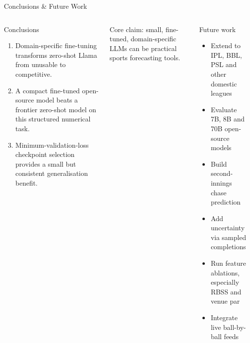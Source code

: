 \documentclass[aspectratio=169,10pt]{beamer}
\begin{document}
\begin{frame}{Conclusions \& Future Work}
\scriptsize
\begin{columns}[T,onlytextwidth]
  \begin{block}{Conclusions}
  \begin{enumerate}
    \item Domain-specific fine-tuning transforms zero-shot Llama from unusable to competitive.
    \item A compact fine-tuned open-source model beats a frontier zero-shot model on this structured numerical task.
    \item Minimum-validation-loss checkpoint selection provides a small but consistent generalisation benefit.
  \end{enumerate}
  \end{block}
  \vspace{0.1cm}
  \alert{Core claim:} small, fine-tuned, domain-specific LLMs can be practical sports forecasting tools.

  \begin{block}{Future work}
  \begin{itemize}
    \item Extend to IPL, BBL, PSL and other domestic leagues
    \item Evaluate 7B, 8B and 70B open-source models
    \item Build second-innings chase prediction
    \item Add uncertainty via sampled completions
    \item Run feature ablations, especially RBSS and venue par
    \item Integrate live ball-by-ball feeds
  \end{itemize}
  \end{block}
\end{columns}
\end{frame}
\end{document}
